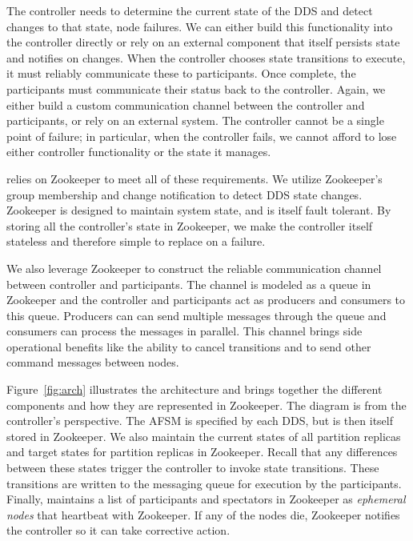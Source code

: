 The controller needs to determine the current state of the DDS and detect
changes to that state, \eg node failures.  We can either build this
functionality into the controller directly or rely on an external component that
itself persists state and notifies on changes. 
When the controller chooses state transitions to execute, it must reliably
communicate these to participants.  Once complete, the participants must
communicate their status back to the controller.  Again, we either build a custom
communication channel between the controller and participants, or rely on an
external system. 
The controller cannot be a single point of failure; in particular, when the
controller fails, we cannot afford to lose either controller functionality or
the state it manages.

\helix relies on Zookeeper to meet all of these requirements.  We utilize
Zookeeper's group membership and change notification to detect DDS state
changes.  Zookeeper is
designed to maintain system state, and is itself fault tolerant.  By storing
all the controller's state in Zookeeper, we make the controller itself stateless
and therefore simple to replace on a failure.  
 
We also leverage Zookeeper to construct the reliable communication channel
between controller and participants.  
The channel is modeled as a queue in Zookeeper and the controller and
participants act as producers and consumers to this queue. Producers can
can send multiple messages through the queue and consumers can process the messages in parallel. 
This channel brings side operational benefits like the ability to cancel
transitions and to send other command messages between nodes.

Figure~\ref{fig:arch} illustrates the \helix architecture and brings together
the different components and how they are represented in Zookeeper.  
The diagram is from the controller's perspective.  The AFSM is specified by each
DDS, but is then itself stored in Zookeeper.  We also maintain the current
states of all partition replicas and target states for partition replicas in
Zookeeper.  Recall that any differences between these states trigger the
controller to invoke state transitions.  These transitions are written to
the messaging queue for execution by the participants.  Finally, \helix
maintains a list of participants and spectators in 
Zookeeper as \emph{ephemeral nodes} that heartbeat with Zookeeper.  If any of
the nodes die, Zookeeper notifies the controller so it can take corrective
action.

